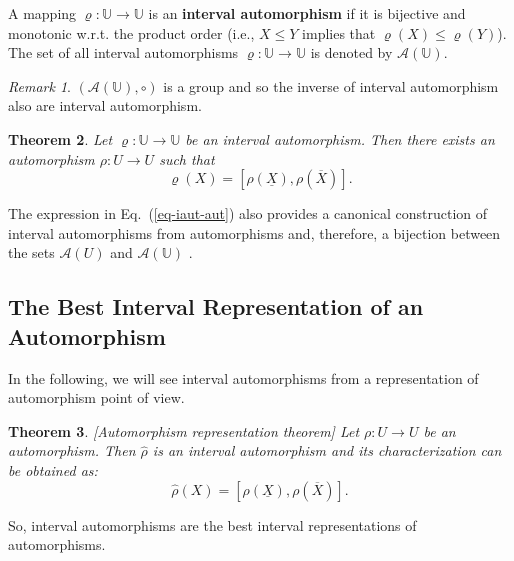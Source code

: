 \documentclass[conference]{IEEEtran}
\theoremstyle{plain}
\newtheorem{theorem}{Theorem}[section]
\theoremstyle{remark}
\newtheorem{remark}[theorem]{Remark}
\theoremstyle{definition}
\theoremstyle{proposition}
\newcommand{\UU}{\mathbb{U} }
\begin{document}
A mapping $\varrho:\UU\rightarrow \UU$ is an \textbf{interval
automorphism} if it is bijective  and monotonic  w.r.t. the
product order \cite{GWW96b,GWW98} (i.e., $X\leq Y$ implies that
$\varrho(X)\leq \varrho(Y)$). The set of all interval
automorphisms $\varrho:\UU\rightarrow \UU$ is denoted by
$\mathcal{A}(\UU)$.

\begin{remark} \label{rem-int-aut}
$(\mathcal{A}(\UU),\circ)$ is a group \cite{GWW96b,GWW98}  and so
the inverse of interval automorphism also are interval
automorphism.
\end{remark}

\begin{theorem}  \cite[Theorem 2]{GWW96b}\label{theo-int-aut-aut}
Let $\varrho:\UU \rightarrow \UU$ be an interval automorphism.
Then there exists an automorphism $\rho: U\rightarrow U$ such that
\begin{equation}
\varrho(X)=[\rho(\underline{X}),\rho(\overline{X})].\label{eq-iaut-aut}
\end{equation}
\end{theorem}


The expression in Eq.~(\ref{eq-iaut-aut}) also provides a
canonical construction of interval automorphisms from
automorphisms and, therefore, a bijection between the sets
$\mathcal{A}(U)$ and $\mathcal{A}(\UU)$ \cite[Theorem 3]{GWW96b}.

\subsection{The Best Interval Representation of an Automorphism}\vspace{-0.1cm}

In the following, we will see interval automorphisms from a representation of automorphism point of view.

\begin{theorem}\cite[Theorem 5.2]{BT06a}[Automorphism representation theorem] \label{theo-cir-aut}
Let $\rho:U\rightarrow U$ be an automorphism. Then
$\widehat{\rho}$ is an interval automorphism and its
characterization can be obtained as:
\begin{equation} \label{eq-aut-iaut}
\widehat{\rho}(X)=[\rho(\underline{X}),\rho(\overline{X})].
\end{equation}
\end{theorem}



So, interval automorphisms are the best interval representations of automorphisms.
\end{document}
